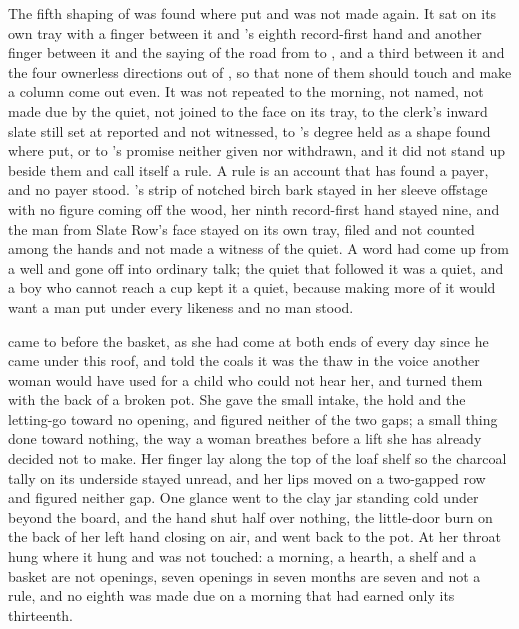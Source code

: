 The fifth shaping of  was found where put and was not made again. It sat on its own tray with a finger between it and 's eighth record-first hand and another finger between it and the saying of the road from  to , and a third between it and the four ownerless directions out of , so that none of them should touch and make a column come out even. It was not repeated to the morning, not named, not made due by the quiet, not joined to the face on its tray, to the clerk's inward slate still set at  reported and not witnessed, to 's degree held as a shape found where put, or to 's promise neither given nor withdrawn, and it did not stand up beside them and call itself a rule. A rule is an account that has found a payer, and no payer stood. 's strip of notched birch bark stayed in her sleeve offstage with no figure coming off the wood, her ninth record-first hand stayed nine, and the man from Slate Row's face stayed on its own tray, filed and not counted among the hands and not made a witness of the quiet. A word had come up from a well and gone off into ordinary talk; the quiet that followed it was a quiet, and a boy who cannot reach a cup kept it a quiet, because making more of it would want a man put under every likeness and no man stood.

 came to  before the basket, as she had come at both ends of every day since he came under this roof, and told the coals it was the thaw in the voice another woman would have used for a child who could not hear her, and turned them with the back of a broken pot. She gave the small intake, the hold and the letting-go toward no opening, and figured neither of the two gaps; a small thing done toward nothing, the way a woman breathes before a lift she has already decided not to make. Her finger lay along the top of the loaf shelf so the charcoal tally on its underside stayed unread, and her lips moved on a two-gapped row and figured neither gap. One glance went to the clay jar standing cold under  beyond the board, and the hand shut half over nothing, the little-door burn on the back of her left hand closing on air, and went back to the pot. At her throat  hung where it hung and was not touched: a morning, a hearth, a shelf and a basket are not openings, seven openings in seven months are seven and not a rule, and no eighth was made due on a morning that had earned only its thirteenth.


